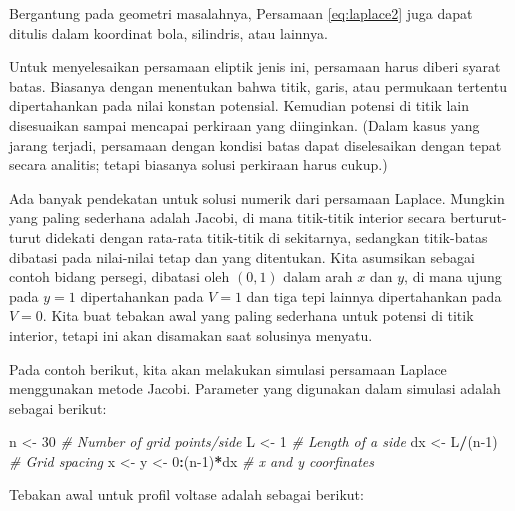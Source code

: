 \documentclass[
]{book}
\newenvironment{Shaded}{\begin{snugshade}}{\end{snugshade}}
\newcommand{\CommentTok}[1]{\textcolor[rgb]{0.56,0.35,0.01}{\textit{#1}}}
\newcommand{\DecValTok}[1]{\textcolor[rgb]{0.00,0.00,0.81}{#1}}
\newcommand{\NormalTok}[1]{#1}
\newcommand{\OtherTok}[1]{\textcolor[rgb]{0.56,0.35,0.01}{#1}}
\newcommand{\SpecialCharTok}[1]{\textcolor[rgb]{0.81,0.36,0.00}{\textbf{#1}}}
\theoremstyle{definition}
\theoremstyle{definition}
\theoremstyle{definition}
\theoremstyle{definition}
\theoremstyle{remark}
\begin{document}
Bergantung pada geometri masalahnya, Persamaan \eqref{eq:laplace2} juga dapat ditulis dalam koordinat bola, silindris, atau lainnya.

Untuk menyelesaikan persamaan eliptik jenis ini, persamaan harus diberi syarat batas. Biasanya dengan menentukan bahwa titik, garis, atau permukaan tertentu dipertahankan pada nilai konstan potensial. Kemudian potensi di titik lain disesuaikan sampai mencapai perkiraan yang diinginkan. (Dalam kasus yang jarang terjadi, persamaan dengan kondisi batas dapat diselesaikan dengan tepat secara analitis; tetapi biasanya solusi perkiraan harus cukup.)

Ada banyak pendekatan untuk solusi numerik dari persamaan Laplace. Mungkin yang paling sederhana adalah Jacobi, di mana titik-titik interior secara berturut-turut didekati dengan rata-rata titik-titik di sekitarnya, sedangkan titik-batas dibatasi pada nilai-nilai tetap dan yang ditentukan. Kita asumsikan sebagai contoh bidang persegi, dibatasi oleh \(\left(0,1\right)\) dalam arah \(x\) dan \(y\), di mana ujung pada \(y = 1\) dipertahankan pada \(V = 1\) dan tiga tepi lainnya dipertahankan pada \(V = 0\). Kita buat tebakan awal yang paling sederhana untuk potensi di titik interior, tetapi ini akan disamakan saat solusinya menyatu.

Pada contoh berikut, kita akan melakukan simulasi persamaan Laplace menggunakan metode Jacobi. Parameter yang digunakan dalam simulasi adalah sebagai berikut:

\begin{Shaded}
\begin{Highlighting}[]
\NormalTok{n   }\OtherTok{\textless{}{-}} \DecValTok{30}                 \CommentTok{\# Number of grid points/side}
\NormalTok{L   }\OtherTok{\textless{}{-}} \DecValTok{1}                  \CommentTok{\# Length of a side}
\NormalTok{dx  }\OtherTok{\textless{}{-}}\NormalTok{ L}\SpecialCharTok{/}\NormalTok{(n}\DecValTok{{-}1}\NormalTok{)            }\CommentTok{\# Grid spacing}
\NormalTok{x   }\OtherTok{\textless{}{-}}\NormalTok{ y    }\OtherTok{\textless{}{-}} \DecValTok{0}\SpecialCharTok{:}\NormalTok{(n}\DecValTok{{-}1}\NormalTok{)}\SpecialCharTok{*}\NormalTok{dx }\CommentTok{\# x and y coorfinates}
\end{Highlighting}
\end{Shaded}

Tebakan awal untuk profil voltase adalah sebagai berikut:
\end{document}
